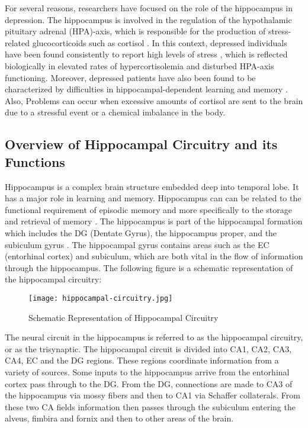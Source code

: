 \documentclass[12pt]{article}
\begin{document}
\enlargethispage{\baselineskip}
For several reasons, researchers have focused on the role of the
hippocampus in depression. The hippocampus is involved in the
regulation of the hypothalamic pituitary adrenal (HPA)-axis, which is
responsible for the production of stress-related glucocorticoids such
as cortisol \cite{cortisol}. In this context, depressed individuals
have been found consistently to report high levels of stress
\cite{stress}, which is reflected biologically in elevated rates of
hypercortisolemia and disturbed HPA-axis functioning. Moreover,
depressed patients have also been found to be characterized by
difficulties in hippocampal-dependent learning and memory
\cite{learning}. Also, Problems can occur when excessive amounts of
cortisol are sent to the brain due to a stressful event or a chemical
imbalance in the body.

\newpage
\subsection{Overview of Hippocampal Circuitry and its Functions}

Hippocampus is a complex brain structure embedded deep into temporal
lobe. It has a major role in learning and memory. Hippocampus can can
be related to the functional requirement of episodic memory and more
specifically to the storage and retrieval of memory
\cite{hippocampal}. The hippocampus is part of the hippocampal
formation which includes the DG (Dentate Gyrus), the hippocampus
proper, and the subiculum gyrus \cite{limbic}. The hippocampal gyrus
contains areas such as the EC (entorhinal cortex) and subiculum, which
are both vital in the flow of information through the hippocampus. The
following figure\cite{hippocampalcircuitry} is a schematic
representation of the hippocampal circuitry:

\begin{figure}[H]
  \centering
  \texttt{[image: hippocampal-circuitry.jpg]}
  \caption{Schematic Representation of Hippocampal Circuitry
  }
\end{figure}

The neural circuit in the hippocampus is referred to as the
hippocampal circuitry, or as the trisynaptic. The hippocampal circuit
is divided into CA1, CA2, CA3, CA4, EC and the DG regions. These
regions coordinate information from a variety of sources. Some inputs
to the hippocampus arrive from the entorhinal cortex pass through to
the DG. From the DG, connections are made to CA3 of the hippocampus
via mossy fibers and then to CA1 via Schaffer collaterals. From these
two CA fields information then passes through the subiculum entering
the alveus, fimbira and fornix and then to other areas of the brain.
\end{document}
